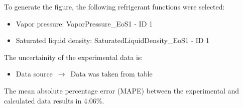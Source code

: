 To generate the figure, the following refrigerant functions were selected:
\begin{itemize}
\item Vapor pressure: VaporPressure\_EoS1 - ID 1
\item Saturated liquid density: SaturatedLiquidDensity\_EoS1 - ID 1
\end{itemize}

The uncertainity of the experimental data is:
\begin{itemize}
\item Data source $\,\to\,$ Data was taken from table
\end{itemize}

The mean absolute percentage error (MAPE) between the experimental and calculated data results in 4.06\%.
\FloatBarrier
\newpage
